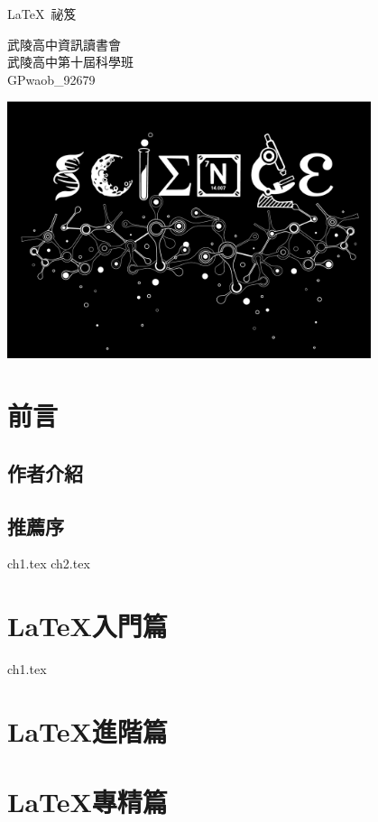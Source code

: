 \documentclass[12pt, a4paper, oneside]{extbook}
\let\tmpLaTeX\LaTeX
\renewcommand{\LaTeX}{\textrm{\tmpLaTeX}}
\begin{document}
	\makebarother %

	\begin{titlepage}
		\begin{center}
			\sffamily
			
			\begin{tcolorbox}[
				halign=flush center,
				drop fuzzy shadow,
				arc=2pt,
				height=4cm,
				valign=center]
				\fontsize{36pt}{\baselineskip}\selectfont \LaTeX\ 祕笈
			\end{tcolorbox}
			
			\vspace*{1cm}
			{\fontsize{24pt}{2\baselineskip}\selectfont%
				武陵高中資訊讀書會 \\
				武陵高中第十屆科學班 \\[\baselineskip]
				GPwaob\_92679}
			 
			
			\vfill
			
			\includegraphics[width=0.8\textwidth]{readme/science.png}
		
		
		\end{center}
	\end{titlepage}

	\tableofcontents

	\part{前言}
	\chapter*{作者介紹}
	\chapter*{推薦序}
	
	{ch1.tex}
	{ch2.tex}
	
	
	\part{\LaTeX 入門篇}
	{ch1.tex}
	
	\part{\LaTeX 進階篇}
	
	\part{\LaTeX 專精篇}
	
\end{document}
